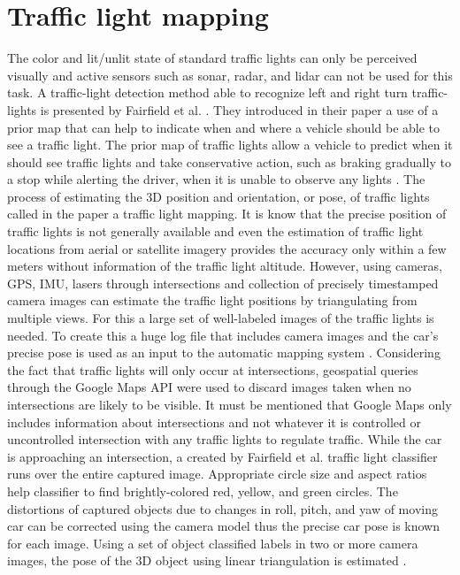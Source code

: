 \documentclass[letterpaper, 10 pt, conference]{ieeeconf} %
\begin{document}
\section{Traffic light mapping}
The color and lit/unlit state of standard traffic lights can only be perceived visually and active sensors such as sonar, radar, and lidar can not be used for this task. A traffic-light detection method able to recognize left and right turn traffic-lights is presented by Fairfield et al. \cite{c5}. They introduced in their paper a use of a prior map that can help to indicate when and where a vehicle should be able to see a traffic light. The prior map of traffic lights allow a vehicle to predict when it should see traffic lights and take conservative action, such as braking gradually to a stop while alerting the driver, when it is unable to observe any lights \cite{c5}. The process of estimating the 3D position and orientation, or pose, of traffic lights called in the paper a traffic light mapping. It is know that the precise position of traffic lights is not generally available and even the estimation of traffic light locations from aerial or satellite imagery provides the accuracy only within a few meters without information of the traffic light altitude. However, using cameras, GPS, IMU, lasers through intersections and collection of precisely timestamped camera images can estimate the traffic light positions by triangulating from multiple views. For this a large set of well-labeled images of the traffic lights is needed. To create this a huge log file that includes camera images and the car's precise pose is used as an input to the automatic mapping system \cite{c5}. Considering the fact that traffic lights will only occur at intersections, geospatial queries through the Google Maps API were used to discard images taken when no intersections are likely to be visible. It must be mentioned that Google Maps only includes information about intersections and not whatever it is controlled or uncontrolled intersection with any traffic lights to regulate traffic. While the car is approaching an intersection, a created by Fairfield et al. traffic light classifier runs over the entire captured image. Appropriate circle size and aspect ratios help classifier to find brightly-colored red, yellow, and green circles. The distortions of captured objects due to changes in roll, pitch, and yaw of moving car can be corrected using the camera model thus the precise car pose is known for each image. Using a set of object classified labels in two or more camera images, the pose of the 3D object using linear triangulation is estimated \cite{c5}.
\end{document}
